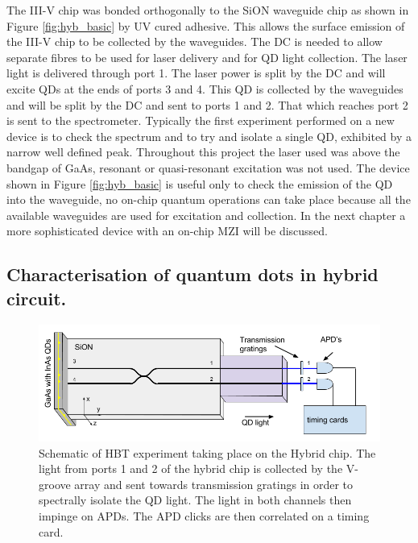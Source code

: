 The III-V chip was bonded orthogonally to the SiON waveguide chip as shown in
Figure \ref{fig:hyb_basic} by UV cured adhesive. This allows the surface
emission of the III-V chip to be collected by the waveguides. The DC is needed
to allow separate fibres to be used for laser delivery and for QD light collection. The
laser light is delivered through port 1. The laser power is split by the DC and
will excite QDs at the ends of ports 3 and 4. This QD is collected by the
waveguides and will be split by the DC and sent to ports 1 and 2. That which
reaches port 2 is sent to the spectrometer. Typically the first experiment
performed on a new device is to check the spectrum and to try and isolate a
single QD, exhibited by a narrow well defined peak. Throughout this project the
laser used was above the bandgap of GaAs, resonant or quasi-resonant excitation
was not used. The device shown in Figure \ref{fig:hyb_basic} is useful only to
check the emission of the QD into the waveguide, no on-chip quantum operations
can take place because all the available waveguides are used for excitation and
collection. In the next chapter a more sophisticated device with an on-chip MZI
will be discussed.

\subsection{Characterisation of quantum dots in hybrid circuit.}

\begin{figure}[h!] \begin{center}
\includegraphics[width=1\textwidth]{images/hyb_hbt.png} \caption{
Schematic of HBT experiment taking place on the Hybrid chip. The light from
ports 1 and 2 of the hybrid chip is collected by the V-groove array and sent
towards transmission gratings in order to spectrally isolate the QD light.  The
light in both channels then impinge on APDs. The APD clicks are then correlated
on a timing card.
} \label{fig:hyb_basic_hbt}\end{center} \end{figure}

